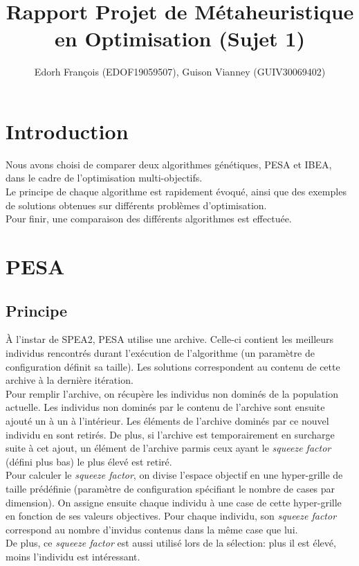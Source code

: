 \documentclass[12pt, letterpaper]{article}
\author{Edorh François (EDOF19059507), Guison Vianney (GUIV30069402)}
\title{Rapport Projet de Métaheuristique en Optimisation (Sujet 1)}
\begin{document}
\maketitle
\tableofcontents
\newpage

\section{Introduction}
Nous avons choisi de comparer deux algorithmes génétiques, PESA et
IBEA, dans le cadre de l'optimisation multi-objectifs.\\

Le principe de chaque algorithme est rapidement évoqué, ainsi que des
exemples de solutions obtenues sur différents problèmes d'optimisation.\\

Pour finir, une comparaison des différents algorithmes est effectuée.

\newpage

\section{PESA}

\subsection{Principe}

À l'instar de SPEA2, PESA utilise une archive. Celle-ci contient les
meilleurs individus rencontrés durant l'exécution de l'algorithme (un
paramètre de configuration définit sa taille). Les solutions
correspondent au contenu de cette archive à la dernière itération.\\

Pour remplir l'archive, on récupère les individus non dominés de la
population actuelle. Les individus non dominés par le contenu de
l'archive sont ensuite ajouté un à un à l'intérieur. Les éléments de
l'archive dominés par ce nouvel individu en sont retirés. De plus, si
l'archive est temporairement en surcharge suite à cet ajout, un
élément de l'archive parmis ceux ayant le \textit{squeeze factor}
(défini plus bas) le plus élevé est retiré.\\

Pour calculer le \textit{squeeze factor}, on divise l'espace objectif
en une hyper-grille de taille prédéfinie (paramètre de configuration
spécifiant le nombre de cases par dimension). On assigne ensuite
chaque individu à une case de cette hyper-grille en fonction de ses
valeurs objectives. Pour chaque individu, son \textit{squeeze factor}
correspond au nombre d'invidus contenus dans la
même case que lui.\\
De plus, ce \textit{squeeze factor} est aussi utilisé lors de la sélection:
plus il est élevé, moins l'individu est intéressant.\\
\end{document}
